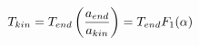 \begin{equation}
T_{kin}=T_{end}\left(a_{end} \over a_{kin} \right) = T_{end} F_1(\alpha)
\label{Tkin}
\end{equation}

